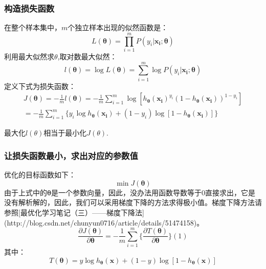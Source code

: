 \documentclass[a4paper,12pt]{book}
\begin{document}
    \subsubsection{构造损失函数}
    在整个样本集中，$m$个独立样本出现的似然函数是：
    $$
    L(\boldsymbol{\theta}) = \prod_{i=1}^{m}P(y_i|\boldsymbol{x_i}; \boldsymbol{\theta})
    $$
    利用最大似然求$\theta$,取对数最大似然：
    $$
    l(\boldsymbol{\theta}) = \log L(\boldsymbol{\theta}) = \sum_{i=1}^{m}\log P(y_i|\boldsymbol{x_i}; \boldsymbol{\theta})
    $$
    定义下式为损失函数：
    \begin{equation}
        \begin{aligned}
            J(\boldsymbol{\theta}) = -\frac{1}{m}l(\boldsymbol{\theta})  = -\frac{1}{m}\sum_{i=1}^{m}\log [h_{\boldsymbol{\theta}}(\boldsymbol{x_i})^{y_i}(1-h_{\boldsymbol{\theta}}(\boldsymbol{x_i}))^{1-y_i}] \\
            =-\frac{1}{m}\sum_{i=1}^{m}\{y_i \log h_{\boldsymbol{\theta}}(\boldsymbol{x_i})+(1-y_i)\log [1-h_{\boldsymbol{\theta}}(\boldsymbol{x_i})]\}
        \end{aligned}
    \end{equation}
    
    最大化$l(\theta) $相当于最小化$J(\theta)$.

    \subsubsection{让损失函数最小，求出对应的参数值}
    优化的目标函数如下：
    $$
    \min J(\boldsymbol{\theta})
    $$
    由于上式中的$\boldsymbol{\theta}$是一个参数向量，因此，没办法用函数导数等于0直接求出，它是没有解析解的，因此，我们可以采用梯度下降的方法求得极小值。梯度下降方法请参照[最优化学习笔记（三）——梯度下降法](http://blog.csdn.net/chunyun0716/article/details/51474158)。
    $$
    \frac{\partial J(\boldsymbol{\theta})}{\partial \boldsymbol{\theta}} =  -\frac{1}{m}\sum_{i=1}^{m}\{\frac{\partial T(\boldsymbol{\theta})}{\partial \boldsymbol{\theta}}\} (1)
    $$
    其中：
    \begin{equation}
        T(\boldsymbol{\theta}) = y \log h_{\boldsymbol{\theta}}(\boldsymbol{x})+(1-y)\log [1-h_{\boldsymbol{\theta}}(\boldsymbol{x})]
    \end{equation}
    
\end{document}
